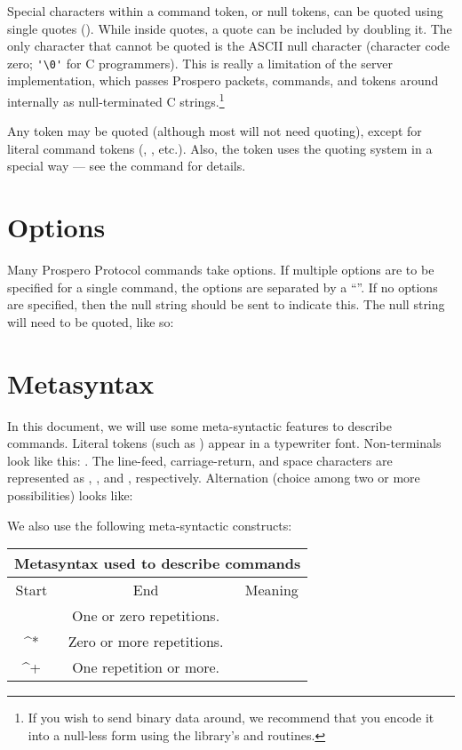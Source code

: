 
Special characters within a command token, or null tokens, can be
quoted using single quotes (). 
While inside quotes, a quote can be included by doubling it.  The only
character that cannot be quoted is the ASCII null character
(character code zero; \verb"'\0'" for C programmers).  This is really
a limitation of the server implementation, which passes Prospero
packets, commands, and tokens around internally as null-terminated
C strings.\footnote{If you wish to send binary data around, we
recommend that you
encode it into a null-less form using the  library's
 and  routines.}

Any token may be quoted (although most will not need quoting), except
for literal command tokens (, , etc.).
Also, the  token uses the quoting system in a
special way --- see the  command for details.

\section{Options}

Many Prospero Protocol commands take options.  If multiple options are
to be specified for a single command, the options are separated by a
``\lit{+}''.  If no options are specified, then the null string should be
sent to indicate this.  The null string will need to be quoted, like
so: 

\section{Metasyntax}

In this document, we will use some meta-syntactic features to describe
commands.  Literal tokens (such as ) appear in a
typewriter font.  Non-terminals look like this: .
The line-feed, carriage-return, and space characters are represented
as , , and , respectively.  Alternation
(choice among two or more possibilities) looks like:
\ors{} \metaor {} \ore

  We also use
the following meta-syntactic constructs:

\begin{center}
\begin{tabular}{|c|c|l|}  \hline 
\multicolumn{3}{|c|}{Metasyntax used to describe commands} \\ \hline
Start   & End   	& \multicolumn{1}{c|}{Meaning} \\ \hline
[       & ]		& One or zero repetitions. \\ \hline
[       & \(]^*\)	& Zero or more repetitions. \\ \hline
[       & \(]^+\)	& One repetition or more. \\ \hline
\end{tabular}
\end{center}


